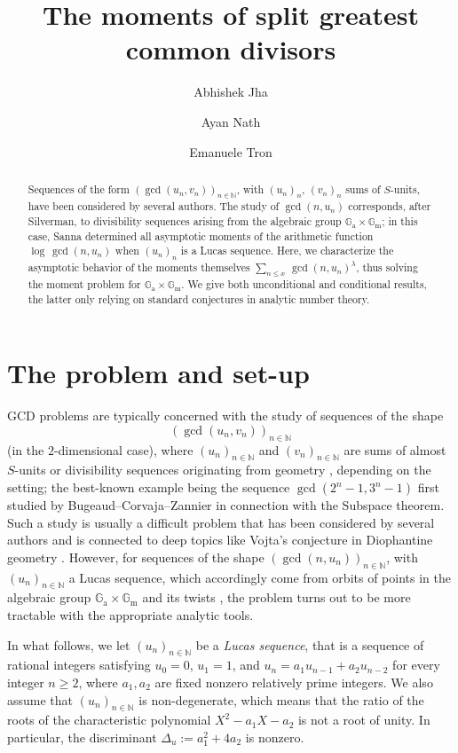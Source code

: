 \documentclass[12pt,a4paper,oneside]{amsart}
\author{Abhishek Jha}
\author{Ayan Nath}
\author{Emanuele Tron}
\title{The moments of split greatest common divisors}
\begin{document}
\begin{abstract}
Sequences of the form $(\gcd(u_n,v_n))_{n \in \mathbb N}$, with $(u_n)_n$, $(v_n)_n$ sums of $S$-units, have been considered by several authors. The study of $\gcd(n,u_n)$ corresponds, after Silverman, to divisibility sequences arising from the algebraic group $\mathbb G_{\mathrm{a}} \times \mathbb G_{\mathrm{m}}$; in this case, Sanna determined all asymptotic moments of the arithmetic function $\log\,\gcd (n,u_n)$ when $(u_n)_n$ is a Lucas sequence. Here, we characterize the asymptotic behavior of the moments themselves $\sum_{n \leq x}\,\gcd(n,u_n)^\lambda$, thus solving the moment problem for $\mathbb G_{\mathrm{a}} \times \mathbb G_{\mathrm{m}}$. We give both unconditional and conditional results, the latter only relying on standard conjectures in analytic number theory.
\end{abstract}

\maketitle

\section{The problem and set-up}

 GCD problems are typically concerned with the study of sequences of the shape \[(\gcd(u_n,v_n))_{n \in \mathbb N}\] (in the $2$-dimensional case), where $(u_n)_{n\in\mathbb N}$ and $(v_n)_{n \in \mathbb N}$ are sums of almost $S$-units \cite{Tr20} or divisibility sequences originating from geometry \cite{Si05}, depending on the setting; the best-known example being the sequence $\gcd(2^n-1,3^n-1)$ \cite{BCZ03} first studied by Bugeaud--Corvaja--Zannier in connection with the Subspace theorem. Such a study is usually a difficult problem that has been considered by several authors and is connected to deep topics like Vojta's conjecture in Diophantine geometry \cite{Si05}. However, for sequences of the shape $(\gcd(n,u_n))_{n \in \mathbb N}$, with $(u_n)_{n \in \mathbb N}$ a Lucas sequence, which accordingly come from orbits of points in the algebraic group $\mathbb G_{\mathrm{a}} \times \mathbb G_{\mathrm{m}}$ and its twists \cite{ST18}, the problem turns out to be more tractable with the appropriate analytic tools.

 In what follows, we let $(u_n)_{n \in \mathbb N}$ be a \emph{Lucas sequence}, that is a sequence of rational integers satisfying $u_0 = 0$, $u_1 = 1$, and $u_n = a_1 u_{n - 1} + a_2 u_{n - 2}$ for every integer $n \geq 2$, where $a_1, a_2$ are fixed nonzero relatively prime integers.
We also assume that $(u_n)_{n\in \mathbb N}$ is non-degenerate, which means that the ratio of the roots of the characteristic polynomial $X^2 - a_1 X - a_2$ is not a root of unity. In particular, the discriminant $\Delta_u := a_1^2 + 4a_2$ is nonzero.
\end{document}
